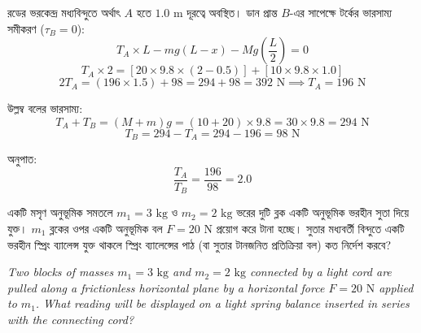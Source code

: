 \documentclass[12pt, a4paper]{article}
\begin{document}
\begin{tcolorbox}[solutionbox={সমাধান (Solution)}]
\noindent
রডের ভরকেন্দ্র মধ্যবিন্দুতে অর্থাৎ $A$ হতে $1.0\text{ m}$ দূরত্বে অবস্থিত। 
ডান প্রান্ত $B$-এর সাপেক্ষে টর্কের ভারসাম্য সমীকরণ ($\tau_B = 0$):
\[ T_A \times L - m g (L - x) - M g \left(\frac{L}{2}\right) = 0 \]
\[ T_A \times 2 = [20 \times 9.8 \times (2 - 0.5)] + [10 \times 9.8 \times 1.0] \]
\[ 2 T_A = (196 \times 1.5) + 98 = 294 + 98 = 392\text{ N} \implies T_A = 196\text{ N} \]

উল্লম্ব বলের ভারসাম্য:
\[ T_A + T_B = (M + m) g = (10 + 20) \times 9.8 = 30 \times 9.8 = 294\text{ N} \]
\[ T_B = 294 - T_A = 294 - 196 = 98\text{ N} \]

অনুপাত:
\[ \frac{T_A}{T_B} = \frac{196}{98} = 2.0 \]
\end{tcolorbox}

\begin{tcolorbox}[questionbox={প্রশ্ন (Question) 18}]
\noindent
একটি মসৃণ অনুভূমিক সমতলে $m_1 = 3\text{ kg}$ ও $m_2 = 2\text{ kg}$ ভরের দুটি ব্লক একটি অনুভূমিক ভরহীন সুতা দিয়ে যুক্ত। $m_1$ ব্লকের ওপর একটি অনুভূমিক বল $F = 20\text{ N}$ প্রয়োগ করে টানা হচ্ছে। সুতার মধ্যবর্তী বিন্দুতে একটি ভরহীন স্প্রিং ব্যালেন্স যুক্ত থাকলে স্প্রিং ব্যালেন্সের পাঠ (বা সুতার টানজনিত প্রতিক্রিয়া বল) কত নির্দেশ করবে?

\vspace{0.8em}
\begin{english}
\noindent\textit{\color{darkgray}
Two blocks of masses $m_1 = 3\text{ kg}$ and $m_2 = 2\text{ kg}$ connected by a light cord are pulled along a frictionless horizontal plane by a horizontal force $F = 20\text{ N}$ applied to $m_1$. What reading will be displayed on a light spring balance inserted in series with the connecting cord?
}
\end{english}
\end{tcolorbox}
\end{document}
